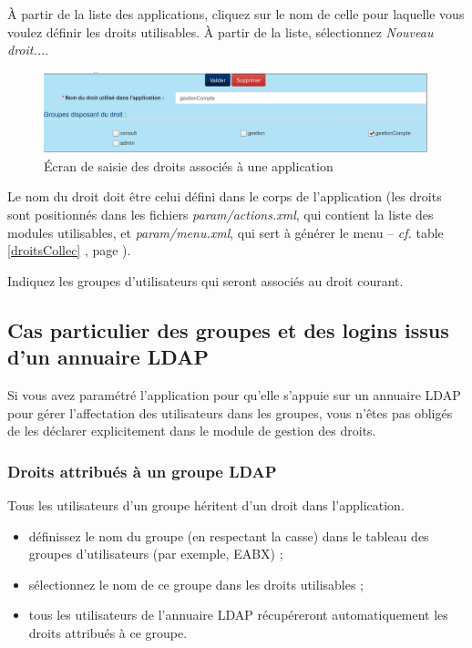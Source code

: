 À partir de la liste des applications, cliquez sur le nom de celle pour laquelle vous voulez définir les droits utilisables. 
À partir de la liste, sélectionnez \textit{Nouveau droit...}.

\begin{figure}[H]
\includegraphics[width=\linewidth]{images/appli_droit.png}
\caption{Écran de saisie des droits associés à une application}
\label{applidroit}
\end{figure}

Le nom du droit doit être celui défini dans le corps de l'application (les droits sont positionnés dans les fichiers \textit{param/actions.xml}, qui contient la liste des modules utilisables, et \textit{param/menu.xml}, qui sert à générer le menu -- \textit{cf.} table \ref{droitsCollec} \textit{}, page \pageref{droitsCollec}).

Indiquez les groupes d'utilisateurs qui seront associés au droit courant.

\subsection{Cas particulier des groupes et des logins issus d'un annuaire LDAP}

Si vous avez paramétré l'application pour qu'elle s'appuie sur un annuaire LDAP pour gérer l'affectation des utilisateurs dans les groupes, vous n'êtes pas obligés de les déclarer explicitement dans le module de gestion des droits.

\subsubsection{Droits attribués à un groupe LDAP}

Tous les utilisateurs d'un groupe héritent d'un droit dans l'application.

\begin{itemize}
\item définissez le nom du groupe (en respectant la casse) dans le tableau des groupes d'utilisateurs (par exemple, EABX) ;
\item sélectionnez le nom de ce groupe dans les droits utilisables ;
\item tous les utilisateurs de l'annuaire LDAP récupéreront automatiquement les droits attribués à ce groupe.
\end{itemize}

